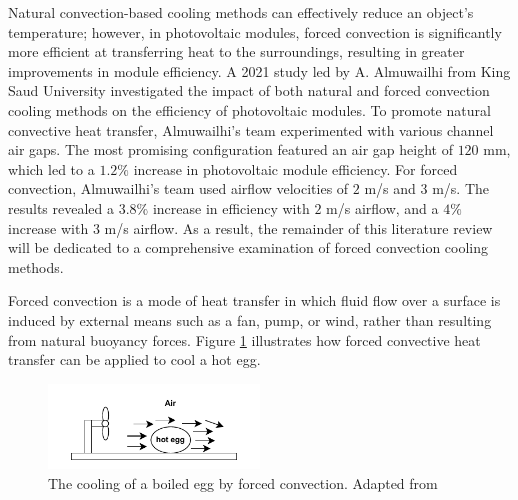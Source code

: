 Natural convection-based cooling methods can effectively reduce an object's temperature; however, in photovoltaic modules, forced convection is significantly more efficient at transferring heat to the surroundings, resulting in greater improvements in module efficiency. A 2021 study led by A. Almuwailhi from King Saud University investigated the impact of both natural and forced convection cooling methods on the efficiency of photovoltaic modules. To promote natural convective heat transfer, Almuwailhi's team experimented with various channel air gaps. The most promising configuration featured an air gap height of $120$ mm, which led to a $1.2\%$ increase in photovoltaic module efficiency. For forced convection, Almuwailhi's team used airflow velocities of $2$ m/s and $3$ m/s. The results revealed a $3.8\%$ increase in efficiency with $2$ m/s airflow, and a $4\%$ increase with $3$ m/s airflow. \cite{Almuwailhi2023InvestigatingRiyadh} As a result, the remainder of this literature review will be dedicated to a comprehensive examination of forced convection cooling methods.

 \label{sec:forced_convection_and_relevant_cooling_methods}
Forced convection is a mode of heat transfer in which fluid flow over a surface is induced by external means such as a fan, pump, or wind, rather than resulting from natural buoyancy forces. \cite{Cengel2014IntroductionConcepts} Figure \ref{fig:cooling_of_boiled_egg_forced_convection} illustrates how forced convective heat transfer can be applied to cool a hot egg.\par

\begin{figure}[ht]
    \centering
    \includegraphics[width=0.5\textwidth, trim=0 5 0 10, clip]{Figures/cooling_of_boiled_egg_forced_convection.pdf}
    \caption{The cooling of a boiled egg by forced convection. Adapted from \cite{Cengel2014IntroductionConcepts}}
    \label{fig:cooling_of_boiled_egg_forced_convection}
\end{figure}


